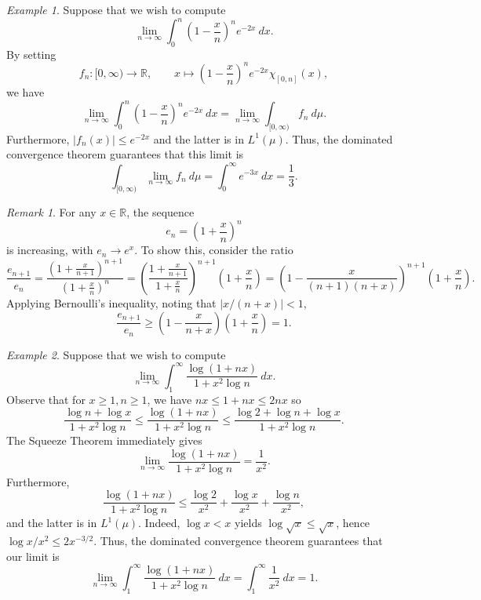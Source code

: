 \documentclass[11pt]{article}
\newcommand{\R}{\mathbb{R}}
\theoremstyle{definition}
\theoremstyle{remark}
\newtheorem*{remark}{Remark}
\newtheorem*{example}{Example}
\numberwithin{equation}{section}
\begin{document}
    \begin{example}
        Suppose that we wish to compute \[
            \lim_{n \to \infty} \int_0^n \left( 1 - \frac{x}{n} \right)^n
            e^{-2x}\:dx.
        \] By setting \[
            f_n\colon [0, \infty) \to \R, \qquad x \mapsto \left( 1 - \frac{x}{n}
            \right)^n e^{-2x}\chi_{[0, n]}(x),
        \] we have \[
            \lim_{n \to \infty} \int_0^n \left( 1 - \frac{x}{n} \right)^n
            e^{-2x}\:dx = \lim_{n \to \infty} \int_{[0, \infty)} f_n\:d\mu.
        \] Furthermore, $|f_n(x)| \leq e^{-2x}$ and the latter is in $L^1(\mu)$.
        Thus, the dominated convergence theorem guarantees that this limit is \[
            \int_{[0, \infty)} \lim_{n \to \infty} f_n\:d\mu = \int_0^\infty
            e^{-3x}\:dx = \frac{1}{3}.
        \] 
        \begin{remark}
            For any $x \in \R$, the sequence \[
                e_n = \left(1 + \frac{x}{n}\right)^n
            \] is increasing, with $e_n \to e^x$. To show this, consider the ratio \[
                \frac{e_{n + 1}}{e_n} = \frac{(1 + \frac{x}{n + 1})^{n + 1}}{(1 +
                \frac{x}{n})^n}
                = \left(\frac{1 + \frac{x}{n + 1}}{1 + \frac{x}{n}}\right)^{n + 1}
                \left(1 + \frac{x}{n}\right)
                = \left(1 - \frac{x}{(n + 1)(n + x)}\right)^{n + 1} \left(1 +
                \frac{x}{n}\right).
            \]
            Applying Bernoulli's inequality, noting that $|x / (n + x)| < 1$, \[
                \frac{e_{n + 1}}{e_n} \geq \left(1 - \frac{x}{n + x}\right)\left(1 +
                \frac{x}{n}\right) = 1.
            \] 
        \end{remark}
    \end{example}

    \begin{example}
        Suppose that we wish to compute \[
            \lim_{n \to \infty} \int_1^\infty \frac{\log(1 + nx)}{1 + x^2\log{n}}\:dx.
        \] Observe that for $x\geq 1, n\geq 1$, we have $nx \leq 1 + nx \leq 2nx$ so
        \[
            \frac{\log{n} + \log{x}}{1 + x^2\log{n}} \leq \frac{\log(1 + nx)}{1 +
            x^2\log{n}} \leq \frac{\log{2} + \log{n} + \log{x}}{1 + x^2\log{n}}.
        \] The Squeeze Theorem immediately gives \[
            \lim_{n \to \infty} \frac{\log(1 + nx)}{1 + x^2\log{n}} = \frac{1}{x^2}.
        \] Furthermore, \[
            \frac{\log(1 + nx)}{1 + x^2\log{n}} \leq \frac{\log{2}}{x^2} +
            \frac{\log{x}}{x^2} + \frac{\log{n}}{x^2},
        \] and the latter is in $L^1(\mu)$. Indeed, $\log{x} < x$ yields
        $\log{\sqrt{x}} \leq \sqrt{x}$, hence $\log{x}/x^2 \leq 2 x^{-3 / 2}$. Thus,
        the dominated convergence theorem guarantees that our limit is \[
            \lim_{n \to \infty} \int_1^\infty \frac{\log(1 + nx)}{1 + x^2\log{n}}\:dx
            = \int_1^\infty \frac{1}{x^2}\:dx = 1.
        \]
    \end{example}
\end{document}
